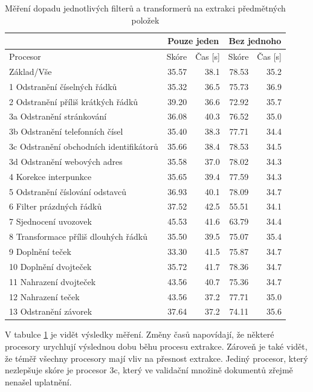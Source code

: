 \documentclass[thesis=M,czech]{FITthesis}[2019/12/23]
\begin{document}
\begin{table}[h!]
\centering
\begin{tabular}{ |l|r|r|r|r| }
\hline
 & \multicolumn{2}{|c|}{Pouze jeden} & \multicolumn{2}{|c|}{Bez jednoho} \\\hline
Procesor & Skóre & Čas [s] & Skóre & Čas [s] \\\hline
\hline
Základ/Vše & 35.57 & 38.1 & 78.53 & 35.2\\\hline
1 Odstranění číselných řádků & 35.32 & 36.5 & 75.73 & 36.9\\
2 Odstranění příliš krátkých řádků & 39.20 & 36.6 & 72.92 & 35.7\\
3a Odstranění stránkování & 36.08 & 40.3 & 76.52 & 35.0\\
3b Odstranění telefonních čísel & 35.40 & 38.3 & 77.71 & 34.4\\
3c Odstranění obchodních identifikátorů & 35.66 & 38.4 & 78.53 & 34.5\\\hline
3d Odstranění webových adres & 35.58 & 37.0 & 78.02 & 34.3\\
4 Korekce interpunkce & 35.65 & 39.4 & 77.59 & 34.3\\
5 Odstranění číslování odstavců & 36.93 & 40.1 & 78.09 & 34.7\\
6 Filter prázdných řádků & 37.52 & 42.5 & 55.51 & 34.1\\
7 Sjednocení uvozovek & 45.53 & 41.6 & 63.79 & 34.4\\\hline
8 Transformace příliš dlouhých řádků & 35.50 & 39.5 & 75.07 & 35.4\\
9 Doplnění teček & 33.30 & 41.5 & 75.87 & 34.7\\
10 Doplnění dvojteček & 35.72 & 41.7 & 78.36 & 34.7\\
11 Nahrazení dvojteček & 43.56 & 40.7 & 75.36 & 34.7\\
12 Nahrazení teček & 43.56 & 37.2 & 77.71 & 35.0\\
13 Odstranění závorek & 37.64 & 37.2 & 74.11 & 35.6\\\hline
\end{tabular}
\caption{Měření dopadu jednotlivých filterů a transformerů na extrakci předmětných položek}
\label{table:experiment_transformers}
\end{table}

V tabulce \ref{table:experiment_transformers} je vidět výsledky měření. Změny časů napovídají, že některé procesory urychlují výslednou dobu běhu procesu extrakce. Zároveň je také vidět, že téměř všechny procesory mají vliv na přesnost extrakce. Jediný procesor, který nezlepšuje skóre je procesor 3c, který ve validační množině dokumentů zřejmě nenašel uplatnění.
\end{document}
